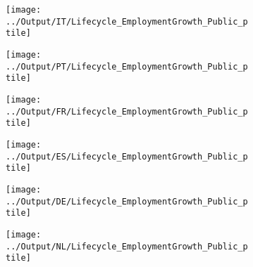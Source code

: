 \documentclass[12pt,notitlepage]{article}
\begin{document}
\begin{figure}[!htpb]
\centering
\caption{Percentiles of Employment Growth (Public Firms in Orbis)}
\begin{subfigure}{.49\textwidth}
    \centering
 \texttt{[image: ../Output/IT/Lifecycle\_EmploymentGrowth\_Public\_ptile]}
\end{subfigure}%
\begin{subfigure}{.49\textwidth}
    \centering
 \texttt{[image: ../Output/PT/Lifecycle\_EmploymentGrowth\_Public\_ptile]}
\end{subfigure}
\begin{subfigure}{.49\textwidth}
    \centering
 \texttt{[image: ../Output/FR/Lifecycle\_EmploymentGrowth\_Public\_ptile]}
\end{subfigure}%
\begin{subfigure}{.49\textwidth}
    \centering
 \texttt{[image: ../Output/ES/Lifecycle\_EmploymentGrowth\_Public\_ptile]}
\end{subfigure}
\begin{subfigure}{.49\textwidth}
    \centering
 \texttt{[image: ../Output/DE/Lifecycle\_EmploymentGrowth\_Public\_ptile]}
\end{subfigure}
\begin{subfigure}{.49\textwidth}
    \centering
 \texttt{[image: ../Output/NL/Lifecycle\_EmploymentGrowth\_Public\_ptile]}
\end{subfigure}
\end{figure}
\pagebreak



\end{document}
